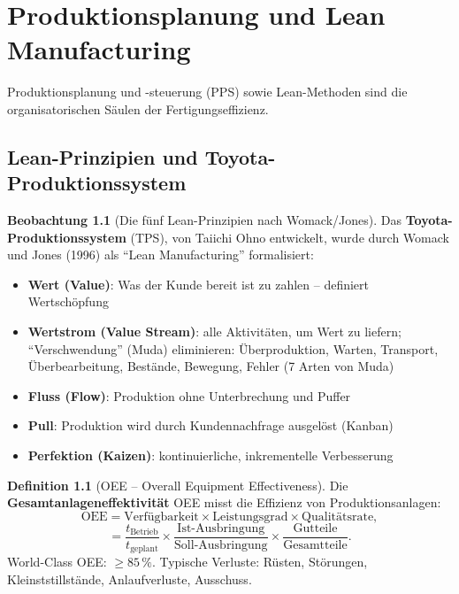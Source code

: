 ﻿\documentclass[a4paper,12pt]{report}
\theoremstyle{definition}
\newtheorem{definition}{Definition}
\newtheorem{beobachtung}{Beobachtung}
\begin{document}
\chapter{Produktionsplanung und Lean Manufacturing}

Produktionsplanung und -steuerung (PPS) sowie Lean-Methoden
sind die organisatorischen Säulen der Fertigungseffizienz.

\section{Lean-Prinzipien und Toyota-Produktionssystem}

\begin{beobachtung}[Die fünf Lean-Prinzipien nach Womack/Jones]
Das \textbf{Toyota-Produktionssystem} (TPS), von Taiichi Ohno entwickelt,
wurde durch Womack und Jones (1996) als ``Lean Manufacturing'' formalisiert:
\begin{itemize}
    \item[-] \textbf{Wert (Value)}: Was der Kunde bereit ist zu zahlen -- definiert Wertschöpfung
    \item[-] \textbf{Wertstrom (Value Stream)}: alle Aktivitäten, um Wert zu liefern;
          ``Verschwendung'' (Muda) eliminieren: Überproduktion, Warten, Transport,
          Überbearbeitung, Bestände, Bewegung, Fehler (7 Arten von Muda)
    \item[-] \textbf{Fluss (Flow)}: Produktion ohne Unterbrechung und Puffer
    \item[-] \textbf{Pull}: Produktion wird durch Kundennachfrage ausgelöst (Kanban)
    \item[-] \textbf{Perfektion (Kaizen)}: kontinuierliche, inkrementelle Verbesserung
\end{itemize}
\end{beobachtung}

\begin{definition}[OEE -- Overall Equipment Effectiveness]
Die \textbf{Gesamtanlageneffektivität} OEE misst die Effizienz von Produktionsanlagen:
\[
  \text{OEE} = \text{Verfügbarkeit} \times \text{Leistungsgrad} \times \text{Qualitätsrate},
\]
\[
  = \frac{t_{\text{Betrieb}}}{t_{\text{geplant}}} \times \frac{\text{Ist-Ausbringung}}{\text{Soll-Ausbringung}} \times \frac{\text{Gutteile}}{\text{Gesamtteile}}.
\]
World-Class OEE: $\ge 85\,\%$. Typische Verluste: Rüsten, Störungen,
Kleinststillstände, Anlaufverluste, Ausschuss.
\end{definition}
\end{document}
